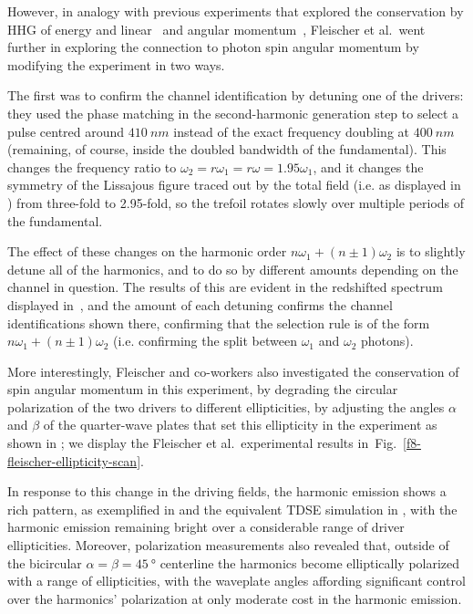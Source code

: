 However, in analogy with previous experiments that explored the conservation by HHG of energy \cite{EnergyConservationExperiment} and linear~\cite{ MomentumConservationExperiment} and angular momentum~\cite{ OAMConservationExperiment}, Fleischer et al.\ went further in exploring the connection to photon spin angular momentum by modifying the experiment in two ways.

The first was to confirm the channel identification by detuning one of the drivers: they used the phase matching in the second-harmonic generation step to select a pulse centred around $\SI{410}{nm}$ instead of the exact frequency doubling at $\SI{400}{nm}$ (remaining, of course, inside the doubled bandwidth of the fundamental). This changes the frequency ratio to $\omega_2=r\omega_1=r\omega=1.95\omega_1$, and it changes the symmetry of the Lissajous figure traced out by the total field (i.e. as displayed in ) from three-fold to 2.95-fold, so the trefoil rotates slowly over multiple periods of the fundamental. 

The effect of these changes on the harmonic order $n\omega_1+(n\pm 1)\omega_2$ is to slightly detune all of the harmonics, and to do so by different amounts depending on the channel in question. The results of this are evident in the redshifted spectrum displayed in~, and the amount of each detuning confirms the channel identifications shown there, confirming that the selection rule is of the form $n\omega_1+(n\pm 1)\omega_2$ (i.e. confirming the split between $\omega_1$ and $\omega_2$ photons).



More interestingly, Fleischer and co-workers also investigated the conservation of spin angular momentum in this experiment, by degrading the circular polarization of the two drivers to different ellipticities, by adjusting the angles $\alpha$ and $\beta$ of the quarter-wave plates that set this ellipticity in the experiment as shown in ; we display the Fleischer et al.\ experimental results in~Fig.~\ref{f8-fleischer-ellipticity-scan}.



In response to this change in the driving fields, the harmonic emission shows a rich pattern, as exemplified in  and the equivalent TDSE simulation in , with the harmonic emission remaining bright over a considerable range of driver ellipticities. Moreover, polarization measurements also revealed that, outside of the bicircular $\alpha=\beta=\SI{45}{\degree}$ centerline the harmonics become elliptically polarized with a range of ellipticities, with the waveplate angles affording significant control over the harmonics' polarization at only moderate cost in the harmonic emission.

